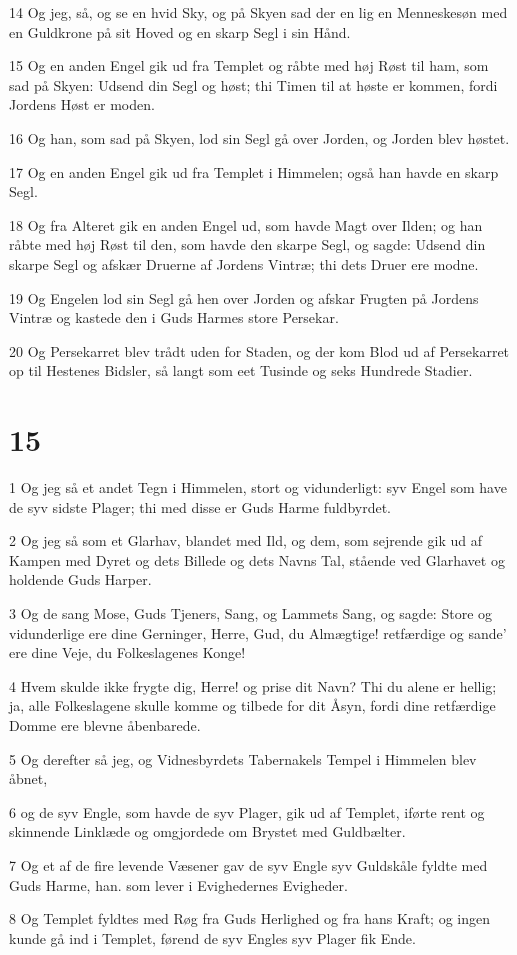 \par 14 Og jeg, så, og se en hvid Sky, og på Skyen sad der en lig en Menneskesøn med en Guldkrone på sit Hoved og en skarp Segl i sin Hånd.
\par 15 Og en anden Engel gik ud fra Templet og råbte med høj Røst til ham, som sad på Skyen: Udsend din Segl og høst; thi Timen til at høste er kommen, fordi Jordens Høst er moden.
\par 16 Og han, som sad på Skyen, lod sin Segl gå over Jorden, og Jorden blev høstet.
\par 17 Og en anden Engel gik ud fra Templet i Himmelen; også han havde en skarp Segl.
\par 18 Og fra Alteret gik en anden Engel ud, som havde Magt over Ilden; og han råbte med høj Røst til den, som havde den skarpe Segl, og sagde: Udsend din skarpe Segl og afskær Druerne af Jordens Vintræ; thi dets Druer ere modne.
\par 19 Og Engelen lod sin Segl gå hen over Jorden og afskar Frugten på Jordens Vintræ og kastede den i Guds Harmes store Persekar.
\par 20 Og Persekarret blev trådt uden for Staden, og der kom Blod ud af Persekarret op til Hestenes Bidsler, så langt som eet Tusinde og seks Hundrede Stadier.

\chapter{15}

\par 1 Og jeg så et andet Tegn i Himmelen, stort og vidunderligt: syv Engel som have de syv sidste Plager; thi med disse er Guds Harme fuldbyrdet.
\par 2 Og jeg så som et Glarhav, blandet med Ild, og dem, som sejrende gik ud af Kampen med Dyret og dets Billede og dets Navns Tal, stående ved Glarhavet og holdende Guds Harper.
\par 3 Og de sang Mose, Guds Tjeners, Sang, og Lammets Sang, og sagde: Store og vidunderlige ere dine Gerninger, Herre, Gud, du Almægtige! retfærdige og sande' ere dine Veje, du Folkeslagenes Konge!
\par 4 Hvem skulde ikke frygte dig, Herre! og prise dit Navn? Thi du alene er hellig; ja, alle Folkeslagene skulle komme og tilbede for dit Åsyn, fordi dine retfærdige Domme ere blevne åbenbarede.
\par 5 Og derefter så jeg, og Vidnesbyrdets Tabernakels Tempel i Himmelen blev åbnet,
\par 6 og de syv Engle, som havde de syv Plager, gik ud af Templet, iførte rent og skinnende Linklæde og omgjordede om Brystet med Guldbælter.
\par 7 Og et af de fire levende Væsener gav de syv Engle syv Guldskåle fyldte med Guds Harme, han. som lever i Evighedernes Evigheder.
\par 8 Og Templet fyldtes med Røg fra Guds Herlighed og fra hans Kraft; og ingen kunde gå ind i Templet, førend de syv Engles syv Plager fik Ende.


